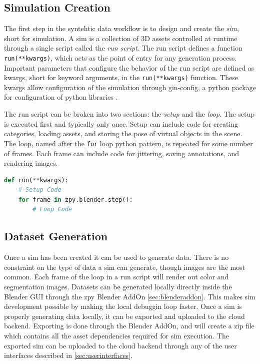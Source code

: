 \documentclass{article}
\begin{document}
\subsection{Simulation Creation}
\label{sec:worflowsimcreation}

The first step in the syntehtic data workflow is to design and create the \emph{sim}, short for simulation. A sim is a collection of 3D assets controlled at runtime through a single script called the \emph{run script}. The run script defines a function \lstinline{run(**kwargs)}, which acts as the point of entry for any generation process. Important parameters that configure the behavior of the run script are defined as kwargs, short for keyword arguments, in the \lstinline{run(**kwargs)} function. These kwargs allow configuration of the simulation through gin-config, a python package for configuration of python libraries \cite{ginconfig}.

The run script can be broken into two sections: the \emph{setup} and the \emph{loop}. The setup is executed first and typically only once. Setup can include code for creating categories, loading assets, and storing the pose of virtual objects in the scene. The loop, named after the \lstinline{for} loop python pattern, is repeated for some number of frames. Each frame can include code for jittering, saving annotations, and rendering images.

\begin{lstlisting}[language=Python,caption={Basic structure of the run function in a sim run script.},label={lst:setuploop}]
def run(**kwargs):
	# Setup Code
	for frame in zpy.blender.step():
		# Loop Code
\end{lstlisting}


\subsection{Dataset Generation}
\label{sec:generation}

Once a sim has been created it can be used to generate data. There is no constraint on the type of data a sim can generate, though images are the most common. Each frame of the loop in a run script will render out color and segmentation images. Datasets can be generated locally directly inside the Blender GUI through the zpy Blender AddOn \ref{sec:blenderaddon}. This makes sim development possible by making the local debuggin loop faster. Once a sim is properly generating data locally, it can be exported and uploaded to the cloud backend. Exporting is done through the Blender AddOn, and will create a zip file which contains all the asset dependencies required for sim execution. The exported sim can be uploaded to the cloud backend through any of the user interfaces described in \ref{sec:userinterfaces}.
\end{document}
